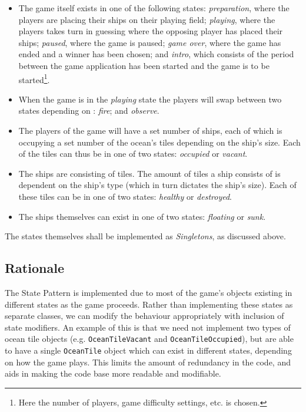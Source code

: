         \begin{itemize}
            \item The game itself exists in one of the following states: \emph{preparation}, where the players are placing their ships on their playing field; \emph{playing}, where the players takes turn in guessing where the opposing player has placed their ships; \emph{paused}, where the game is paused; \emph{game over}, where the game has ended and a winner has been chosen; and \emph{intro}, which consists of the period between the game application has been started and the game is to be started\footnote{Here the number of players, game difficulty settings, etc. is chosen.}.

            \item When the game is in the \emph{playing} state the players will swap between two states depending on : \emph{fire}; and \emph{observe}.
    
            \item The players of the game will have a set number of ships, each of which is occupying a set number of the ocean's tiles depending on the ship's size. Each of the tiles can thus be in one of two states: \emph{occupied} or \emph{vacant}.
    
            \item The ships are consisting of tiles. The amount of tiles a ship consists of is dependent on the ship's type (which in turn dictates the ship's size). Each of these tiles can be in one of two states: \emph{healthy} or \emph{destroyed}.
    
            \item The ships themselves can exist in one of two states: \emph{floating} or \emph{sunk}.            
    
        \end{itemize}
    
        The states themselves shall be implemented as \emph{Singletons}, as discussed above.
    
        \subsection{Rationale}
        The State Pattern is implemented due to most of the game's objects existing in different states as the game proceeds. Rather than implementing these states as separate classes, we can modify the behaviour appropriately with inclusion of state modifiers. An example of this is that we need not implement two types of ocean tile objects (e.g. \texttt{OceanTileVacant} and \texttt{OceanTileOccupied}), but are able to have a single \texttt{OceanTile} object which can exist in different states, depending on how the game plays. This limits the amount of redundancy in the code, and aids in making the code base more readable and modifiable.
    
